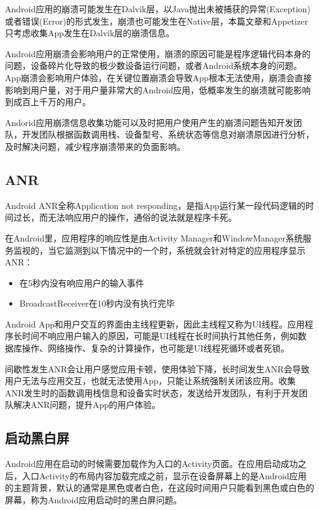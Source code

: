 Android应用的崩溃可能发生在Dalvik层，以Java抛出未被捕获的异常(Exception)或者错误(Error)的形式发生，崩溃也可能发生在Native层，本篇文章和Appetizer只考虑收集App发生在Dalvik层的崩溃信息。

Android应用崩溃会影响用户的正常使用，崩溃的原因可能是程序逻辑代码本身的问题，设备碎片化导致的极少数设备运行问题，或者Android系统本身的问题。App崩溃会影响用户体验，在关键位置崩溃会导致App根本无法使用，崩溃会直接影响到用户量，对于用户量非常大的Android应用，低概率发生的崩溃就可能影响到成百上千万的用户。

Andorid应用崩溃信息收集功能可以及时把用户使用产生的崩溃问题告知开发团队，开发团队根据函数调用栈、设备型号、系统状态等信息对崩溃原因进行分析，及时解决问题，减少程序崩溃带来的负面影响。

\subsection{ANR}

Android ANR全称Application not responding，是指App运行某一段代码逻辑的时间过长，而无法响应用户的操作，通俗的说法就是程序卡死。

 在Android里，应用程序的响应性是由Activity Manager和WindowManager系统服务监视的，当它监测到以下情况中的一个时，系统就会针对特定的应用程序显示ANR：
 
 \begin{itemize}
 	\item 在5秒内没有响应用户的输入事件
 	\item BroadcastReceiver在10秒内没有执行完毕
 \end{itemize}

Android App和用户交互的界面由主线程更新，因此主线程又称为UI线程。应用程序长时间不响应用户输入的原因，可能是UI线程在长时间执行其他任务，例如数据库操作、网络操作、复杂的计算操作，也可能是UI线程死循环或者死锁。

间歇性发生ANR会让用户感觉应用卡顿，使用体验下降，长时间发生ANR会导致用户无法与应用交互，也就无法使用App，只能让系统强制关闭该应用。收集ANR发生时的函数调用栈信息和设备实时状态，发送给开发团队，有利于开发团队解决ANR问题，提升App的用户体验。


\subsection{启动黑白屏}

Android应用在启动的时候需要加载作为入口的Activity页面。在应用启动成功之后，入口Activity的布局内容加载完成之前，显示在设备屏幕上的是Android应用的主题背景，默认的通常是黑色或者白色，在这段时间用户只能看到黑色或白色的屏幕，称为Android应用启动时的黑白屏问题。

